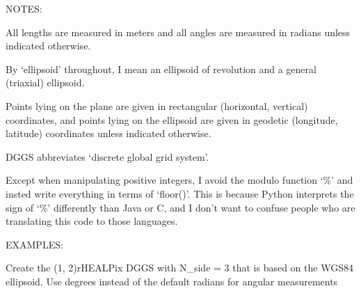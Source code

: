 \documentclass[a4paper,12ptopenany,oneside,english]{sphinxmanual}
\begin{document}
\sphinxAtStartPar
NOTES:

\sphinxAtStartPar
All lengths are measured in meters and all angles are measured in radians
unless indicated otherwise.

\sphinxAtStartPar
By ‘ellipsoid’ throughout, I mean an ellipsoid of revolution and  a general (triaxial) ellipsoid.

\sphinxAtStartPar
Points lying on the plane are given in rectangular (horizontal, vertical) coordinates, and points lying on the ellipsoid are given in geodetic (longitude, latitude) coordinates unless indicated otherwise.

\sphinxAtStartPar
DGGS abbreviates ‘discrete global grid system’.

\sphinxAtStartPar
Except when manipulating positive integers, I avoid the modulo function ‘\%’
and insted write everything in terms of ‘floor()’.
This is because Python interprets the sign of ‘\%’ differently than
Java or C, and I don’t want to confuse people who are translating this code
to those languages.

\sphinxAtStartPar
EXAMPLES:

\sphinxAtStartPar
Create the (1, 2)\sphinxhyphen{}rHEALPix DGGS with N\_side = 3 that is based on the WGS84 ellipsoid. Use degrees instead of the default radians for angular measurements
\end{document}
